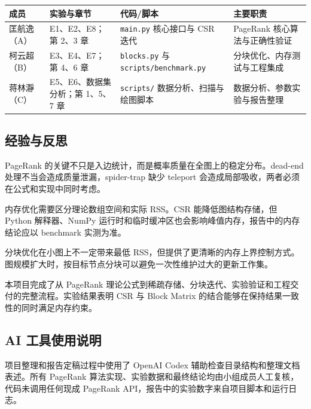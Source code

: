 \documentclass[UTF8,a4paper,12pt]{ctexart}
\begin{document}
\begin{center}
\small
\begin{tabularx}{\textwidth}{>{\raggedright\arraybackslash}p{2.7cm} >{\raggedright\arraybackslash}p{2.8cm} >{\raggedright\arraybackslash}X >{\raggedright\arraybackslash}X}
\toprule
成员 & 实验与章节 & 代码/脚本 & 主要职责 \\
\midrule
匡航逸（A） & E1、E2、E8；第 2、3 章 & \texttt{main.py} 核心接口与 CSR 迭代 & PageRank 核心算法与正确性验证 \\
柯云超（B） & E3、E4、E7；第 4、6 章 & \texttt{blocks.py} 与 \texttt{scripts/benchmark.py} & 分块优化、内存测试与工程集成 \\
蒋林瀞（C） & E5、E6、数据集分析；第 1、5、7 章 & \texttt{scripts/} 数据分析、扫描与绘图脚本 & 数据分析、参数实验与报告整理 \\
\bottomrule
\end{tabularx}
\end{center}

\subsection{经验与反思}

PageRank 的关键不只是入边统计，而是概率质量在全图上的稳定分布。dead-end 处理不当会造成质量泄漏，spider-trap 缺少 teleport 会造成局部吸收，两者必须在公式和实现中同时考虑。

内存优化需要区分理论数组空间和实际 RSS。CSR 能降低图结构存储，但 Python 解释器、NumPy 运行时和临时缓冲区也会影响峰值内存，报告中的内存结论应以 benchmark 实测为准。

分块优化在小图上不一定带来最低 RSS，但提供了更清晰的内存上界控制方式。图规模扩大时，按目标节点分块可以避免一次性维护过大的更新工作集。

本项目完成了从 PageRank 理论公式到稀疏存储、分块迭代、实验验证和工程交付的完整流程。实验结果表明 CSR 与 Block Matrix 的结合能够在保持结果一致性的同时满足内存约束。

\subsection{AI 工具使用说明}

项目整理和报告定稿过程中使用了 OpenAI Codex 辅助检查目录结构和整理文档表述。所有 PageRank 算法实现、实验数据和最终结论均由小组成员人工复核，代码未调用任何现成 PageRank API，报告中的实验数字来自项目脚本和运行日志。


\renewcommand{\refname}{参考文献}
\nocite{*}


\end{document}
